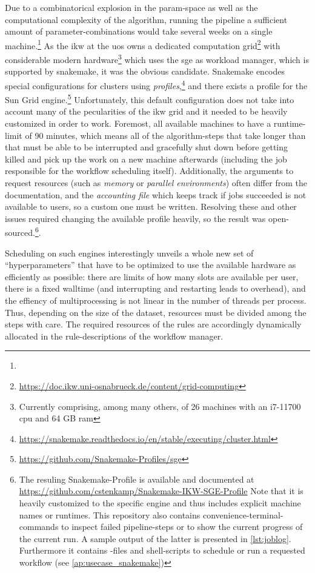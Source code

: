 Due to a combinatorical explosion in the \gls{param}-space as well as the computational complexity of the algorithm, running the pipeline a sufficient amount of parameter-combinations would take several weeks on a single machine.\footnote{} As the \gls{ikw} at the \gls{uos} owns a dedicated computation grid\footnote{\url{https://doc.ikw.uni-osnabrueck.de/content/grid-computing}} with considerable modern hardware\footnote{Currently comprising, among many others, of 26 machines with an i7-11700 \gls{cpu} and 64 GB \gls{ram}} which uses the \gls{sge} as workload manager, which is supported by snakemake, it was the obvious candidate. Snakemake encodes special configurations for clusters using \emph{profiles},\footnote{\url{https://snakemake.readthedocs.io/en/stable/executing/cluster.html}} and there exists a profile for the Sun Grid engine.\footnote{\url{https://github.com/Snakemake-Profiles/sge}} Unfortunately, this default configuration does not take into account many of the pecularities of the \gls{ikw} grid and it needed to be heavily customized in order to work. Foremost, all available machines to \me have a runtime-limit of 90 minutes, which means all of the algorithm-steps that take longer than that must be able to be interrupted and gracefully shut down before getting killed and pick up the work on a new machine afterwards (including the job responsible for the workflow scheduling itself). Additionally, the arguments to request resources (such as \emph{memory} or \emph{parallel environments}) often differ from the documentation, and the \emph{accounting file} which keeps track if jobs succeeded is not available to users, so a custom one must be written. Resolving these and other issues required changing the available profile heavily, so the result was open-sourced.\footnote{The resuling Snakemake-Profile is available and documented at \url{https://github.com/cstenkamp/Snakemake-IKW-SGE-Profile} Note that it is heavily customized to the specific engine and thus includes explicit machine names or runtimes. This repository also contains convenience-terminal-commands to inspect failed pipeline-steps or to show the current progress of the current run. A sample output of the latter is presented in \autoref{lst:joblog}. Furthermore it contains -files and shell-scripts to schedule or run a requested workflow (see \autoref{ap:usecase_snakemake})}. 


Scheduling on such engines interestingly unveils a whole new set of ``hyperparameters'' that have to be optimized to use the available hardware as efficiently as possible: there are limits of how many slots are available per user, there is a fixed walltime (and interrupting and restarting leads to overhead), and the effiency of multiprocessing is not linear in the number of threads per process. Thus, depending on the size of the dataset, resources must be divided among the steps with care. The required resources of the rules are accordingly dynamically allocated in the rule-descriptions of the workflow manager.

